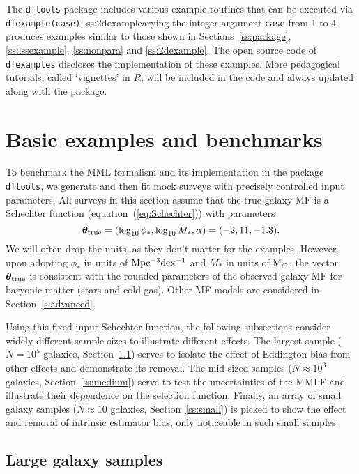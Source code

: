 \documentclass[a4paper,fleqn,usenatbib]{mnras}
\newcommand{\be}{\begin{equation}}
\newcommand{\ee}{\end{equation}}
\newcommand{\msun}{{\rm M}_{\odot}}
\newcommand{\dftools}{\texttt{dftools}\xspace}
\newcommand{\eq}[1]{equation~(\ref{eq:#1})}
\newcommand{\s}[1]{Section~\ref{s:#1}}
\renewcommand{\ss}[1]{Section~\ref{ss:#1}}
\newcommand{\para}{{\bm{\theta}}}
\begin{document}
The \dftools package includes various example routines that can be executed via \texttt{dfexample(case)}. ss:2dexamplearying the integer argument \texttt{case} from 1 to 4 produces examples similar to those shown in Sections~\ref{ss:package}, \ref{ss:lssexample}, \ref{ss:nonpara} and \ref{ss:2dexample}. The open source code of \texttt{dfexamples} discloses the implementation of these examples. More pedagogical tutorials, called `vignettes' in $R$, will be included in the code and always updated along with the package.


\section{Basic examples and benchmarks}\label{s:examples}

To benchmark the MML formalism and its implementation in the package \dftools, we generate and then fit mock surveys with precisely controlled input parameters. All surveys in this section assume that the true galaxy MF is a Schechter function (\eq{Schechter}) with parameters
%
\be\label{eq:true}
	\para_{\rm true}=(\log_{10}\phi_\ast,\log_{10}M_\ast,\alpha)=(-2,11,-1.3).
\ee
%
We will often drop the units, as they don't matter for the examples. However, upon adopting $\phi_\ast$ in units of $\rm Mpc^{-3}dex^{-1}$ and $M_\ast$ in units of $\msun$, the vector $\para_{\rm true}$ is consistent with the rounded parameters of the observed galaxy MF \citep{Bell2003b,Papastergis2012} for baryonic matter (stars and cold gas). Other MF models are considered in \s{advanced}.

Using this fixed input Schechter function, the following subsections consider widely different sample sizes to illustrate different effects. The largest sample ($N=10^5$ galaxies, \ss{large}) serves to isolate the effect of Eddington bias from other effects and demonstrate its removal. The mid-sized samples ($N\approx10^3$ galaxies, \ss{medium}) serve to test the uncertainties of the MMLE and illustrate their dependence on the selection function. Finally, an array of small galaxy samples ($N\approx10$ galaxies, \ss{small}) is picked to show the effect and removal of intrinsic estimator bias, only noticeable in such small samples.

\subsection{Large galaxy samples}\label{ss:large}
\end{document}

